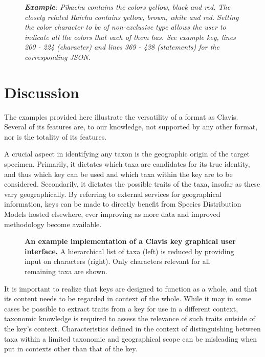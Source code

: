 \documentclass[10pt,letterpaper]{article}
\begin{document}
\begin{figure}[!h]
  \caption{\textit{\textbf{Example}:
Pikachu contains the colors yellow, black and red. The closely related Raichu contains yellow, brown, white and red. Setting the color character to be of non-exclusive type allows the user to indicate all the colors that each of them has. See example key, lines 200 - 224 (character) and lines 369 - 438 (statements) for the corresponding JSON.
}}
 \label{fig4}
\end{figure}

\section*{
Discussion
}
The examples provided here illustrate the versatility of a format as Clavis. Several of its features are, to our knowledge, not supported by any other format, nor is the totality of its features.

A crucial aspect in identifying any taxon is the geographic origin of the target specimen. Primarily, it dictates which taxa are candidates for its true identity, and thus which key can be used and which taxa within the key are to be considered. Secondarily, it dictates the possible traits of the taxa, insofar as these vary geographically. By referring to external services for geographical information, keys can be made to directly benefit from Species Distribution Models hosted elsewhere, ever improving as more data and improved methodology become available.

           
\begin{figure}[!h]
  \caption{{\bf An example implementation of a Clavis key graphical user interface.}
A hierarchical list of taxa (left) is reduced by providing input on characters (right). Only characters relevant for all remaining taxa are shown.
}
  \label{fig5}
\end{figure}

It is important to realize that keys are designed to function as a whole, and that its content needs to be regarded in context of the whole. While it may in some cases be possible to extract traits from a key for use in a different context, taxonomic knowledge is required to assess the relevance of such traits outside of the key's context. Characteristics defined in the context of distinguishing between taxa within a limited taxonomic and geographical scope can be misleading when put in contexts other than that of the key.
\end{document}
